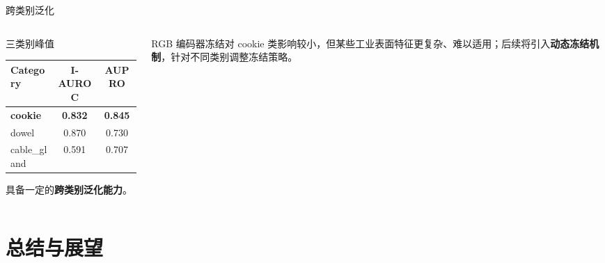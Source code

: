 \documentclass[10pt,aspectratio=43]{beamer}
\begin{document}
\begin{frame}{跨类别泛化}
  \vspace{-0.2em}
  \begin{columns}[T]
    \begin{column}{0.45\textwidth}
      \begin{block}{三类别峰值}
        \footnotesize
        \centering
        \renewcommand{\arraystretch}{1.25}
        \begin{tabular}{lcc}
          \toprule
          \textbf{Category} & \textbf{I-AUROC} & \textbf{AUPRO} \\
          \midrule
          \rowcolor{ZJULight}
          \textbf{cookie} & \textbf{0.832} & \textbf{0.845} \\
          dowel           & 0.870 & 0.730 \\
          cable\_gland    & 0.591 & 0.707 \\
          \bottomrule
        \end{tabular}
      \end{block}
      \vspace{0.6em}
      \begin{hlbox}
        \centering\footnotesize
        具备一定的\textbf{跨类别泛化能力}。
      \end{hlbox}
    \end{column}
    \begin{column}{0.55\textwidth}
      \begin{hlbox}[title=猜测问题：冻结策略不通用]
        \footnotesize
        RGB 编码器冻结对 cookie 类影响较小，但某些工业表面特征更复杂、难以适用；后续将引入\textbf{动态冻结机制}，针对不同类别调整冻结策略。
      \end{hlbox}
    \end{column}
  \end{columns}
\end{frame}

\section{总结与展望}
\end{document}
